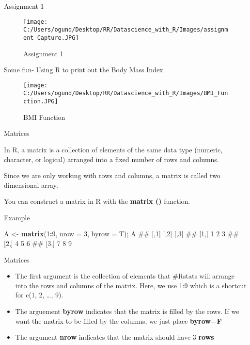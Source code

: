 \documentclass[ignorenonframetext,]{beamer}
\newenvironment{Shaded}{\begin{snugshade}}{\end{snugshade}}
\newcommand{\KeywordTok}[1]{\textcolor[rgb]{0.13,0.29,0.53}{\textbf{#1}}}
\newcommand{\DataTypeTok}[1]{\textcolor[rgb]{0.13,0.29,0.53}{#1}}
\newcommand{\DecValTok}[1]{\textcolor[rgb]{0.00,0.00,0.81}{#1}}
\newcommand{\StringTok}[1]{\textcolor[rgb]{0.31,0.60,0.02}{#1}}
\newcommand{\OperatorTok}[1]{\textcolor[rgb]{0.81,0.36,0.00}{\textbf{#1}}}
\newcommand{\NormalTok}[1]{#1}
\providecommand{\tightlist}{%
  \setlength{\itemsep}{0pt}\setlength{\parskip}{0pt}}
\begin{document}
\begin{frame}{Assignment 1}

\begin{figure}
\centering
\texttt{[image: C:/Users/ogund/Desktop/RR/Datascience\_with\_R/Images/assignment\_Capture.JPG]}
\caption{Assignment 1}
\end{figure}

\end{frame}

\begin{frame}{Some fun- Using R to print out the Body Mass Index}

\begin{figure}
\centering
\texttt{[image: C:/Users/ogund/Desktop/RR/Datascience\_with\_R/Images/BMI\_Function.JPG]}
\caption{BMI Function}
\end{figure}

\end{frame}

\begin{frame}[fragile]{Matrices}

In R, a matrix is a collection of elements of the same data type
(numeric, character, or logical) arranged into a fixed number of rows
and columns.

Since we are only working with rows and columns, a matrix is called two
dimensional array.

You can construct a matrix in R with the \textbf{matrix ()} function.

\begin{block}{Example}

\begin{Shaded}
\begin{Highlighting}[]
\NormalTok{A <-}\StringTok{ }\KeywordTok{matrix}\NormalTok{(}\DecValTok{1}\OperatorTok{:}\DecValTok{9}\NormalTok{, }\DataTypeTok{nrow =} \DecValTok{3}\NormalTok{, }\DataTypeTok{byrow =}\NormalTok{ T); A}
\NormalTok{##      [,1] [,2] [,3]}
\NormalTok{## [1,]    1    2    3}
\NormalTok{## [2,]    4    5    6}
\NormalTok{## [3,]    7    8    9}
\end{Highlighting}
\end{Shaded}

\end{block}

\end{frame}

\begin{frame}{Matrices}

\begin{itemize}
\tightlist
\item
  The first argument is the collection of elements that \#Rstats will
  arrange into the rows and columns of the matrix. Here, we use 1:9
  which is a shortcut for c(1, 2, \ldots{}, 9).
\item
  The arguement \textbf{byrow} indicates that the matrix is filled by
  the rows. If we want the matrix to be filled by the columns, we just
  place \textbf{byrow=F}
\item
  The argument \textbf{nrow} indicates that the matrix should have 3
  \textbf{rows}
\end{itemize}

\end{frame}
\end{document}
